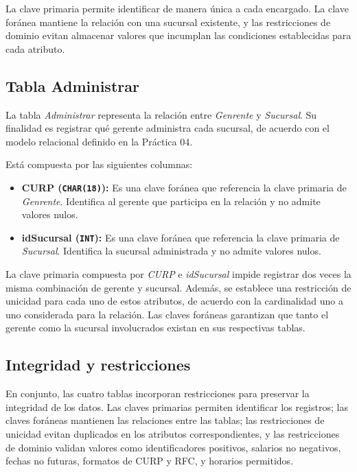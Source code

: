 La clave primaria permite identificar de manera única a cada encargado. La clave foránea mantiene la relación con una sucursal existente, y las restricciones de dominio evitan almacenar valores que incumplan las condiciones establecidas para cada atributo.

\subsection{Tabla Administrar}

La tabla \textit{Administrar} representa la relación entre \textit{Genrente} y \textit{Sucursal}. Su finalidad es registrar qué gerente administra cada sucursal, de acuerdo con el modelo relacional definido en la Práctica 04.

Está compuesta por las siguientes columnas:

\begin{itemize}
    \item \textbf{CURP (\texttt{CHAR(18)}):} Es una clave foránea que referencia la clave primaria de \textit{Genrente}. Identifica al gerente que participa en la relación y no admite valores nulos.

    \item \textbf{idSucursal (\texttt{INT}):} Es una clave foránea que referencia la clave primaria de \textit{Sucursal}. Identifica la sucursal administrada y no admite valores nulos.
\end{itemize}

La clave primaria compuesta por \textit{CURP} e \textit{idSucursal} impide registrar dos veces la misma combinación de gerente y sucursal. Además, se establece una restricción de unicidad para cada uno de estos atributos, de acuerdo con la cardinalidad uno a uno considerada para la relación. Las claves foráneas garantizan que tanto el gerente como la sucursal involucrados existan en sus respectivas tablas.

\subsection{Integridad y restricciones}

En conjunto, las cuatro tablas incorporan restricciones para preservar  la integridad de los datos. Las claves primarias permiten identificar los registros; las claves foráneas mantienen las relaciones entre las tablas; las restricciones de unicidad evitan duplicados en los atributos correspondientes, y las restricciones de dominio validan valores como identificadores positivos, salarios no negativos, fechas no futuras, formatos de CURP y RFC, y horarios permitidos.

